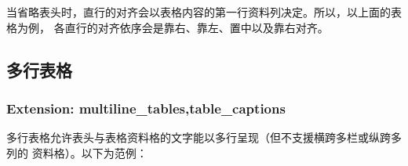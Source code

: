 \documentclass[cn]{elegantbook}
\begin{document}
当省略表头时，直行的对齐会以表格内容的第一行资料列决定。所以，以上面的表格为例，
各直行的对齐依序会是靠右、靠左、置中以及靠右对齐。

\hypertarget{ux591aux884cux8868ux683c}{%
\subsection{多行表格}\label{ux591aux884cux8868ux683c}}

\hypertarget{extension-multiline_tablestable_captions}{%
\subsubsection{Extension:
multiline\_tables,table\_captions}\label{extension-multiline_tablestable_captions}}

多行表格允许表头与表格资料格的文字能以多行呈现（但不支援横跨多栏或纵跨多列的
资料格）。以下为范例：
\end{document}
